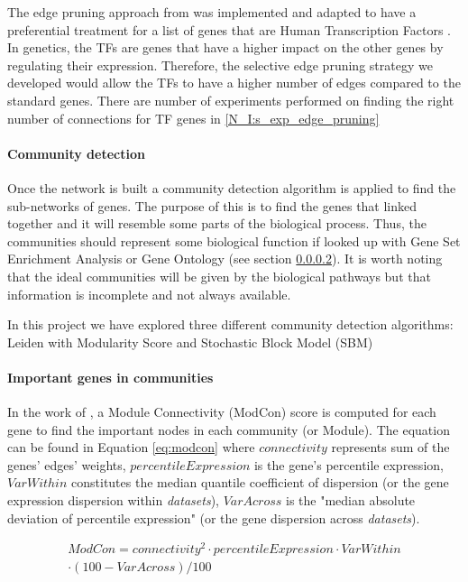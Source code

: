 The edge pruning approach from \citet{Care2019-ij} was implemented and adapted to have a preferential treatment for a list of genes that are Human Transcription Factors \cite{Lambert2018-el}. In genetics, the TFs are genes that have a higher impact on the other genes by regulating their expression. Therefore, the selective edge pruning strategy we developed would allow the TFs to have a higher number of edges compared to the standard genes. There are number of experiments performed on finding the right number of connections for TF genes in \ref{N_I:s_exp_edge_pruning}

\paragraph{Community detection}

Once the network is built a community detection algorithm is applied to find the sub-networks of genes. The purpose of this is to find the genes that linked together and it will resemble some parts of the biological process. Thus, the communities should represent some biological function if looked up with Gene Set Enrichment Analysis or Gene Ontology (see section \ref{}). It is worth noting that the ideal communities will be given by the biological pathways but that information is incomplete and not always available.

In this project we have explored three different community detection algorithms: Leiden with Modularity Score and Stochastic Block Model (SBM)

\paragraph{Important genes in communities}

In the work of \citet{Care2019-ij}, a Module Connectivity (ModCon) score is computed for each gene to find the important nodes in each community (or Module). The equation can be found in Equation \ref{eq:modcon} where $connectivity$ represents sum of the genes' edges' weights, $percentileExpression$ is the gene's percentile expression, $VarWithin$ constitutes the median quantile coefficient of dispersion (or the gene expression dispersion within \textit{datasets}), $VarAcross$ is the "median absolute deviation of percentile expression" (or the gene dispersion across \textit{datasets}).

\begin{multline} \label{eq:modcon}
         ModCon = connectivity^2 \cdot percentileExpression \cdot VarWithin \\
         \cdot (100 - VarAcross) / 100
\end{multline}

